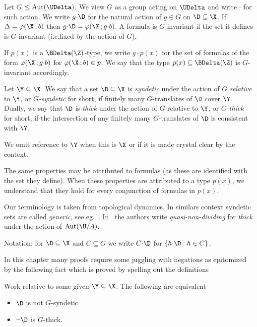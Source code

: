 Let \emph{$G$\/} $\le{\rm Aut}(\UDelta)$.
We view $G$ as a group acting on $\UDelta$ and write ${\cdot}$ for such action.
We write $g{\cdot}\D$ for the natural action of $g\in G$ on $\D\subseteq\X$.
If $\Delta=\varphi(\X\,;b)$ then $g{\cdot}\D=\varphi(\X\,;g{\cdot}b)$.
A formula is $G$-invariant if the set it defines is $G$-invariant (i.e.\@ fixed by the action of $G$).

If $p(x)$ is a $\BDelta(\Z)$-type, we write $g{\cdot}p(x)$ for the set of formulas of the form $\varphi(\X\,;g{\cdot}b)$ for $\varphi(\X\,;b)\in p$.
We say that the type $p(x)\subseteq\BDelta(\Z)$ is $G$-invariant accordingly.

Let $\Y\subseteq\X$.
We say that a set $\D\subseteq\X$ is \emph{syndetic\/} under the action of $G$ \emph{relative\/} to $\Y$, or \emph{$G$-syndetic\/} for short, if finitely many $G$-translates of $\D$ cover $\Y$.
Dually, we say that $\D$ is \emph{thick\/} under the action of $G$ relative to $\Y$, or \emph{$G$-thick\/} for short, if the intersection of any finitely many $G$-translates of $\D$ is consistent with $\Y$.

We omit reference to $\Y$ when this is $\X$ or if it is made crystal clear by the context.

The same properties may be attributed to formulas (as these are identified with the set they define).
When these properties are attributed to a type $p(x)$, we understand that they hold for every conjunction of formulas in $p(x)$.

Our terminology is taken from topological dynamics.
In similars context syndetic sets are called \textit{generic,} see eg.~\cite{Ne}.
In~\cite{CK} the authors write \textit{quasi-non-dividing\/} for \textit{thick\/} under the action of ${\rm Aut}(\U/A)$.

Notation: for $\D\subseteq\X$ and $C\subseteq G$ we write \emph{$C{\cdot}\D$\/} for $\{h{\cdot}\D: h\in C\}$.

In this chapter many proofs require some juggling with negations as epitomized by the following fact which is proved by spelling out the definitions

\begin{fact}\label{fact_fip}
  Work relative to some given $\Y\subseteq\X$.
  The following are equivalent
  \begin{itemize}
    \item[1.] $\D$ is not $G$-syndetic
    \item[2.] $\neg\D$ is $G$-thick.
  \end{itemize}\smallskip
\end{fact}

